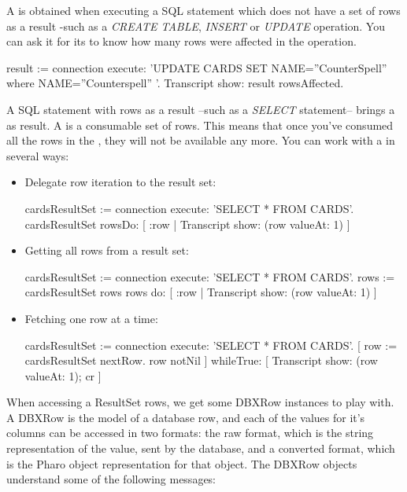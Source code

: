 \documentclass[a4paper,10pt,twoside]{book}
\begin{document}
A  is obtained when executing a SQL statement which does not have a set of rows as a result -such as a \emph{CREATE TABLE}, \emph{INSERT} or \emph{UPDATE} operation.  You can ask it for its  to know how many rows were affected in the operation.

\begin{code}{}
result := connection execute: 'UPDATE CARDS SET NAME=''CounterSpell'' where NAME=''Counterspell'' '.
Transcript show: result rowsAffected.
\end{code}

A SQL statement with rows as a result --such as a \emph{SELECT} statement-- brings a  as result.  A  is a consumable set of rows.  This means that once you've consumed all the rows in the , they will not be available any more.  You can work with a  in several ways:


\begin{itemize}
\item Delegate row iteration to the result set:
\begin{code}{}
cardsResultSet := connection execute: 'SELECT * FROM CARDS'.
cardsResultSet rowsDo: [ :row | Transcript show: (row valueAt: 1) ]
\end{code}
\item Getting all rows from a result set:
\begin{code}{}
cardsResultSet := connection execute: 'SELECT * FROM CARDS'.
rows := cardsResultSet rows
rows do: [ :row | Transcript show: (row valueAt: 1) ]
\end{code}
\item Fetching one row at a time:
\begin{code}{}
cardsResultSet := connection execute: 'SELECT * FROM CARDS'.
[ row := cardsResultSet nextRow.
  row notNil ] 
    whileTrue: [ Transcript show: (row valueAt: 1); cr ]
\end{code}
\end{itemize}


When accessing a ResultSet rows, we get some DBXRow instances to play with.  A DBXRow is the model of a database row, and each of the values for it's columns can be accessed in two formats: the raw format, which is the string representation of the value, sent by the database, and a converted format, which is the Pharo object representation for that object.
The DBXRow objects understand some of the following messages:
\end{document}
